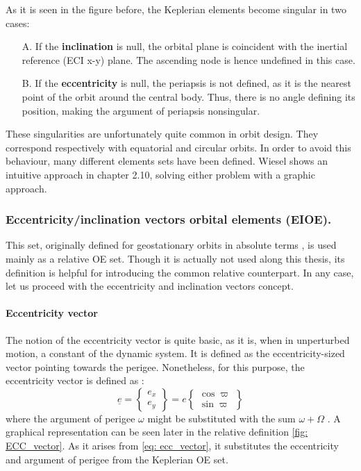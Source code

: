 	\FloatBarrier
	\indent As it is seen in the figure before, the Keplerian elements become singular in two cases:
	\begin{itemize}
	\item[A.] If the \textbf{inclination} is null, the orbital plane is coincident with the inertial reference (ECI x-y) plane. The ascending node is hence undefined in this case. 
	\item[B.] If the \textbf{eccentricity} is null, the periapsis is not defined, as it is the nearest point of the orbit around the central body. Thus, there is no angle defining its position, making the argument of periapsis nonsingular. 
	\end{itemize}
	\indent These singularities are unfortunately quite common in orbit design. They correspond respectively with equatorial and circular orbits. In order to avoid this behaviour, many different elements sets have been defined. Wiesel \cite{Wiesel} shows an intuitive approach in chapter 2.10, solving either problem with a graphic approach.
	\subsubsection{Eccentricity/inclination vectors orbital elements (EIOE).}\label{sec: EIOE}
	\indent This set, originally defined for geostationary orbits in absolute terms \cite{Eckstein}, is used mainly as a relative OE set. Though it is actually not used along this thesis, its definition is helpful for introducing the common relative counterpart.  In any case, let us proceed with the eccentricity and inclination vectors concept.
	\paragraph{Eccentricity vector \\}
	\indent The notion of the eccentricity vector is quite basic, as it is, when in unperturbed motion, a constant of the dynamic system. It is defined as the eccentricity-sized vector pointing towards the perigee. Nonetheless, for this purpose, the eccentricity vector is defined as \cite{DAmico_montenbruck}:
	\begin{equation}
	\underline{e} = 
	\left\{ 
	\begin{array}{c}
	e_x \\[1.5em]
	e_y
	\end{array}
	\right\} = e
	\left\{ 
	\begin{array}{c}
	\cos\varpi \\[1.5em]
	\sin\varpi
	\end{array}
	\right\}
	\label{eq: 	ecc_vector}
	\end{equation}
	\noindent where the argument of perigee $\omega$ might be substituted with the sum $\omega + \Omega$ \cite[as in][]{Eckstein}. A graphical representation can be seen later in the relative definition \ref{fig: 	ECC_vector}. As it arises from \eqref{eq: 	ecc_vector}, it substitutes the eccentricity and argument of perigee from the Keplerian OE set.

